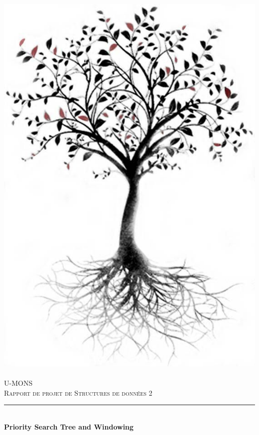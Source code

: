 \documentclass[10pt,a4paper]{article}
\newcommand{\HRule}{\rule{\linewidth}{0.5mm}}
\begin{document}
\begin{titlepage}
  \begin{sffamily}
  \begin{center}

    \includegraphics[scale=0.15]{images/tree.jpg}~\\[1.5cm]

    \textsc{\LARGE U-MONS}\\[2cm]

    \textsc{\Large Rapport de projet de Structures de données 2}\\[1.5cm]

    \HRule \\[0.4cm]
    { \huge \bfseries Priority Search Tree and Windowing\\[0.4cm] }


\end{center}
\end{sffamily}
\end{titlepage}
\end{document}
